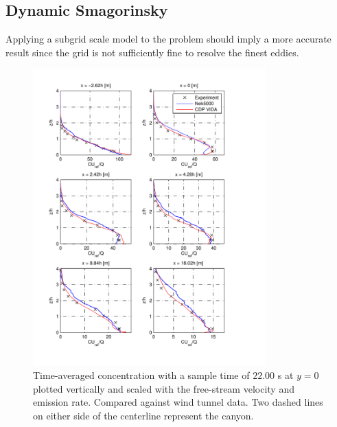 \subsection{Dynamic Smagorinsky}
Applying a subgrid scale model to the problem should imply a more accurate result 
since the grid is not sufficiently fine to resolve the finest eddies. 
%
\begin{figure}[h]
	\centering
	\includegraphics[width=0.8\textwidth]{Figures/Nek_smag_cV.pdf}
	\caption{Time-averaged concentration with a sample time of $22.00$ s at $y = 0$ plotted
    vertically and scaled 
	with the free-stream velocity and emission rate. Compared against wind tunnel data.
Two dashed lines on either side of the centerline represent the canyon.}
	\label{fig:cVsmag}
\end{figure}
%
%
